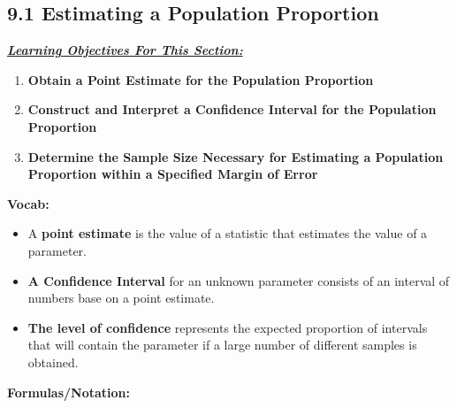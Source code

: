 \documentclass{report}
\begin{document}
    \subsection{9.1 Estimating a Population Proportion}
    \bigbreak \noindent \bigbreak \noindent  
    \textbf{\textit{\underline{Learning Objectives For This Section:}}}
    \begin{enumerate}
        \item \textbf{Obtain a Point Estimate for the Population Proportion}
        \item \textbf{Construct and Interpret a Confidence Interval for the Population Proportion}
        \item \textbf{Determine the Sample Size Necessary for Estimating a Population Proportion within a Specified Margin of Error}
    \end{enumerate}
    \bigbreak \noindent \bigbreak \noindent 
    \textbf{Vocab:}
    \begin{itemize}
        \item A \textbf{point estimate} is the value of a statistic that estimates the value of a parameter.
        \item \textbf{A Confidence Interval} for an  unknown parameter consists of an interval of numbers base on a point estimate.
        \item \textbf{The level of confidence} represents the expected proportion of intervals that will contain the parameter if a large number of different samples is obtained.
    \end{itemize}
    \bigbreak \noindent \bigbreak \noindent 
    \textbf{Formulas/Notation:}
\end{document}
